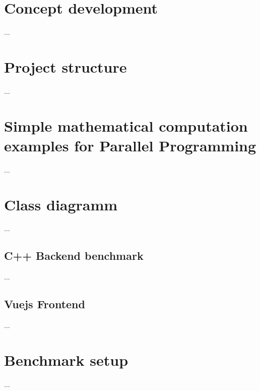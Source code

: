 \section{Concept development}

...\newpage

\section{Project structure}

...\newpage

\section{Simple mathematical computation examples for Parallel Programming}

...\newpage

\section{Class diagramm}

...

\subsection{C++ Backend benchmark}

...

\subsection{Vuejs Frontend}

...\newpage

\section{Benchmark setup}

...
